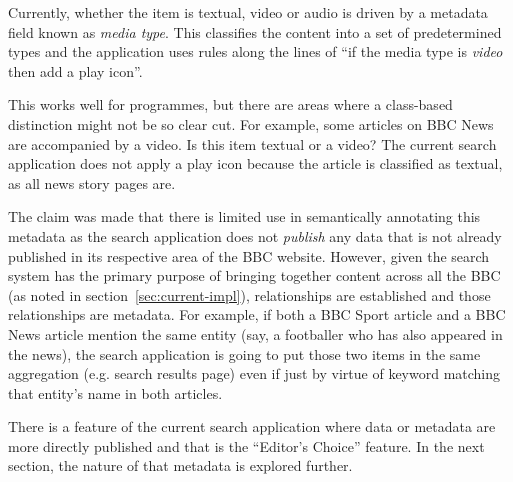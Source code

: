 Currently, whether the item is textual, video or audio is driven by
a metadata field known as \emph{media type}. This classifies the content
into a set of predetermined types and the application uses rules
along the lines of ``if the media type is \emph{video} then add a play icon''.

This works well for programmes, but there are areas where
a class-based distinction might not be so clear cut. For example, some articles
on BBC News are accompanied by a video. Is this item textual or a video?
The current search application does not apply a play icon because the
article is classified as textual, as all news story pages are.

The claim was made that there is limited use in semantically annotating
this metadata as the search application does not \emph{publish} any data
that is not already published in its respective area of the BBC website.
However, given the search system has the primary purpose of bringing
together content across all the BBC (as noted in section~\ref{sec:current-impl}),
relationships are established and those relationships are metadata.
For example, if both a BBC Sport article and a BBC News article mention
the same entity (say, a footballer who has also appeared in the news),
the search application is going to put those two items in the same aggregation
(e.g. search results page) even if just by virtue of keyword matching that
entity's name in both articles.

There is a feature of the current search application where data or metadata
are more directly published and that is the ``Editor's Choice'' feature. In
the next section, the nature of that metadata is explored further.
